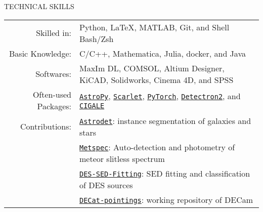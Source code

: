 \documentclass[11pt]{article}
\begin{document}
\begin{section}{TECHNICAL SKILLS}

\begin{tabular}{rl}
    Skilled in: & Python, \LaTeX, MATLAB, Git, and Shell Bash/Zsh \\
    Basic Knowledge: & C/C++, Mathematica, Julia, docker, and Java \\
    Softwares: & MaxIm DL, COMSOL, Altium Designer, KiCAD, Solidworks, Cinema 4D, and SPSS \\
    Often-used Packages: & \href{https://www.astropy.org/}{\texttt{AstroPy}}, \href{https://github.com/pmelchior/scarlet}{\texttt{Scarlet}}, \href{https://pytorch.org/}{\texttt{PyTorch}}, \href{https://github.com/facebookresearch/detectron2}{\texttt{Detectron2}}, and \href{https://cigale.lam.fr/}{\texttt{CIGALE}} \\
    Contributions: & \href{https://github.com/burke86/astrodet}{\texttt{Astrodet}}: instance segmentation of galaxies and stars \\
    & \href{https://github.com/Chisen-Lupus/metspec}{\texttt{Metspec}}: Auto-detection and photometry of meteor slitless spectrum \\
    & \href{https://github.com/Chisen-Lupus/DES-SED-fitting}{\texttt{DES-SED-Fitting}}: SED fitting and classification of DES sources\\
    & \href{https://github.com/gnarayan/decat_pointings}{\texttt{DECat-pointings}}: working repository of DECam
\end{tabular}

\end{section} 
\end{document}
